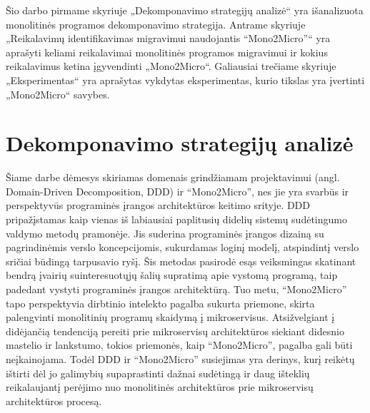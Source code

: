 \documentclass{VUMIFPSbakalaurinis}
\begin{document}
Šio darbo pirmame skyriuje „Dekomponavimo strategijų analizė“ yra išanalizuota monolitinės programos dekomponavimo strategija. Antrame skyriuje „Reikalavimų identifikavimas migravimui naudojantis \enquote{Mono2Micro}“ yra aprašyti keliami reikalavimai monolitinės programos migravimui ir kokius reikalavimus ketina įgyvendinti „Mono2Micro“. Galiausiai trečiame skyriuje „Eksperimentas“ yra aprašytas vykdytas eksperimentas, kurio tikslas yra įvertinti „Mono2Micro“ savybes.


\section{Dekomponavimo strategijų analizė}
Šiame darbe dėmesys skiriamas domenais grindžiamam projektavimui (angl. Domain-Driven Decomposition, DDD) ir \enquote{Mono2Micro}, nes jie yra svarbūs ir perspektyvūs programinės įrangos architektūros keitimo srityje. DDD pripažįstamas kaip vienas iš labiausiai paplitusių didelių sistemų sudėtingumo valdymo metodų pramonėje. Jis suderina programinės įrangos dizainą su pagrindinėmis verslo koncepcijomis, sukurdamas loginį modelį, atspindintį verslo sričiai būdingą tarpusavio ryšį. Šis metodas pasirodė esąs veiksmingas skatinant bendrą įvairių suinteresuotųjų šalių supratimą apie vystomą programą, taip padedant vystyti programinės įrangos architektūrą. Tuo metu, \enquote{Mono2Micro} tapo perspektyvia dirbtinio intelekto pagalba sukurta priemone, skirta palengvinti monolitinių programų skaidymą į mikroservisus. Atsižvelgiant į didėjančią tendenciją pereiti prie mikroservisų architektūros siekiant didesnio mastelio ir lankstumo, tokios priemonės, kaip \enquote{Mono2Micro}, pagalba gali būti neįkainojama. Todėl DDD ir \enquote{Mono2Micro} susiejimas yra derinys, kurį reikėtų ištirti dėl jo galimybių supaprastinti dažnai sudėtingą ir daug išteklių reikalaujantį perėjimo nuo monolitinės architektūros prie mikroservisų architektūros procesą.
\end{document}

